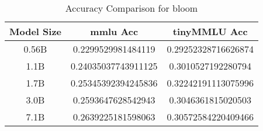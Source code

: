 \begin{table}[h!]
\centering
\begin{tabular}{|c|c|c|}
\hline
Model Size & mmlu Acc & tinyMMLU Acc \\ 
\hline
0.56B & 0.2299529981484119 & 0.29252328716626874 \\ 
\hline
1.1B & 0.24035037743911125 & 0.3010527192280794 \\ 
\hline
1.7B & 0.25345392394245836 & 0.32242191113075996 \\ 
\hline
3.0B & 0.2593647628542943 & 0.3046361815020503 \\ 
\hline
7.1B & 0.2639225181598063 & 0.30572584220409466 \\ 
\hline
\end{tabular}
\caption{Accuracy Comparison for bloom}
\end{table}
